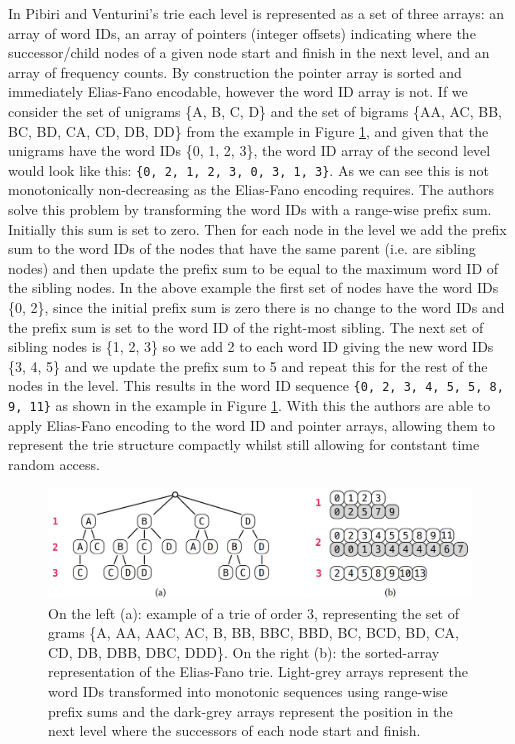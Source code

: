 \documentclass[sigconf, nonacm=true]{acmart}
\begin{document}
In Pibiri and Venturini's trie each level is represented as a set of three arrays: an array of word IDs, an array of pointers (integer offsets) indicating where the successor/child nodes of a given node start and finish in the next level, and an array of frequency counts. By construction the pointer array is sorted and immediately Elias-Fano encodable, however the word ID array is not. If we consider the set of unigrams \{A, B, C, D\} and the set of bigrams \{AA, AC, BB, BC, BD, CA, CD, DB, DD\} from the example in Figure \ref{fig:elias_fano_trie}, and given that the unigrams have the word IDs \{0, 1, 2, 3\}, the word ID array of the second level would look like this: \texttt{\{0, 2, 1, 2, 3, 0, 3, 1, 3\}}. As we can see this is not monotonically non-decreasing as the Elias-Fano encoding requires. The authors solve this problem by transforming the word IDs with a range-wise prefix sum. Initially this sum is set to zero. Then for each node in the level we add the prefix sum to the word IDs of the nodes that have the same parent (i.e. are sibling nodes) and then update the prefix sum to be equal to the maximum word ID of the sibling nodes. In the above example the first set of nodes have the word IDs \{0, 2\}, since the initial prefix sum is zero there is no change to the word IDs and the prefix sum is set to the word ID of the right-most sibling. The next set of sibling nodes is \{1, 2, 3\} so we add 2 to each word ID giving the new word IDs \{3, 4, 5\} and we update the prefix sum to 5 and repeat this for the rest of the nodes in the level. This results in the word ID sequence \texttt{\{0, 2, 3, 4, 5, 5, 8, 9, 11\}} as shown in the example in Figure \ref{fig:elias_fano_trie}. With this the authors are able to apply Elias-Fano encoding to the word ID and pointer arrays, allowing them to represent the trie structure compactly whilst still allowing for contstant time random access.

\begin{figure}
    \centering
    \includegraphics[width=\linewidth]{figures/elias-fano_trie.png}
    \caption{On the left (a): example of a trie of order 3, representing the set of grams \{A, AA, AAC, AC, B, BB, BBC, BBD, BC, BCD, BD, CA, CD, DB, DBB, DBC, DDD\}. On the right (b): the sorted-array representation of the Elias-Fano trie. Light-grey arrays represent the word IDs transformed into monotonic sequences using range-wise prefix sums and the dark-grey arrays represent the position in the next level where the successors of each node start and finish.\protect\footnotemark}
    \label{fig:elias_fano_trie}
\end{figure}
\end{document}

